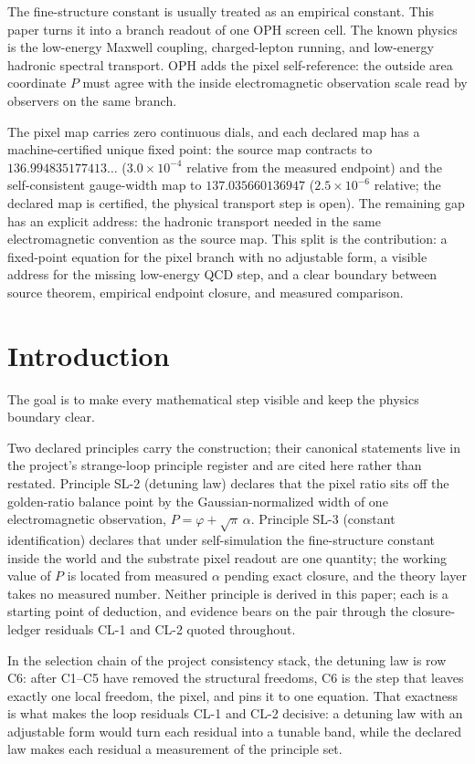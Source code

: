 \documentclass[11pt]{article}
\theoremstyle{remark}
\begin{document}
The fine-structure constant is usually treated as an empirical constant. This paper
turns it into a branch readout of one OPH screen cell. The known physics is the
low-energy Maxwell coupling, charged-lepton running, and low-energy hadronic
spectral transport. OPH adds the pixel self-reference: the outside area coordinate
\(P\) must agree with the inside electromagnetic observation scale read by
observers on the same branch.

The pixel map carries zero continuous dials, and each declared map has a
machine-certified unique fixed point: the source map contracts to
\(136.994835177413\ldots\) (\(3.0\times10^{-4}\) relative from the measured
endpoint) and the self-consistent gauge-width map to
\(137.035660136947\) (\(2.5\times10^{-6}\) relative; the declared map is
certified, the physical transport step is open). The remaining
gap has an explicit address: the hadronic transport needed in the same
electromagnetic convention as the source map. This split is the contribution: a fixed-point
equation for the pixel branch with no adjustable form, a visible address for the missing low-energy
QCD step, and a clear boundary between source theorem, empirical endpoint
closure, and measured comparison.

\section{Introduction}

The goal is to make every mathematical step visible and keep the physics boundary clear.

Two declared principles carry the construction; their canonical statements live in
the project's strange-loop principle register and are cited here rather than restated. Principle SL-2
(detuning law) declares that the pixel ratio sits off the golden-ratio balance
point by the Gaussian-normalized width of one electromagnetic observation,
\(P=\varphi+\sqrt\pi\,\alpha\). Principle SL-3 (constant identification) declares
that under self-simulation the fine-structure constant inside the world and
the substrate pixel readout are one quantity; the working value of \(P\) is
located from measured \(\alpha\) pending exact closure, and the theory layer
takes no measured number. Neither principle is derived in this paper; each is a starting point of
deduction, and evidence bears on the pair through the closure-ledger residuals
CL-1 and CL-2 quoted throughout.

In the selection chain of the project consistency stack,
the detuning law is row C6: after C1--C5
have removed the structural freedoms, C6 is the step that leaves exactly one
local freedom, the pixel, and pins it to one equation. That exactness is what
makes the loop residuals CL-1 and CL-2 decisive: a detuning law with an
adjustable form would turn each residual into a tunable band, while the
declared law makes each residual a measurement of the principle set.
\end{document}
